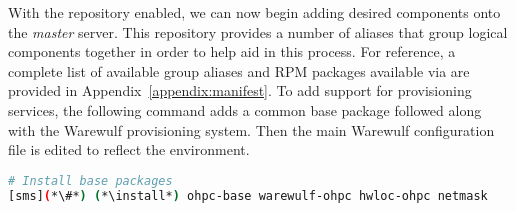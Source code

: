 With the \OHPC{} repository enabled, we can now begin adding desired components onto the
{\em master} server. This repository provides a number of aliases that group
logical components together in order to help aid in this process. For
reference, a complete list of available group aliases and RPM packages available
via \OHPC{} are provided in Appendix~\ref{appendix:manifest}. To add
support for provisioning services, the following command adds a common base
package followed along with the Warewulf provisioning system. Then the main
Warewulf configuration file is edited to reflect the environment.


\begin{lstlisting}[language=bash,keywords={}]
# Install base packages
[sms](*\#*) (*\install*) ohpc-base warewulf-ohpc hwloc-ohpc netmask
\end{lstlisting}


